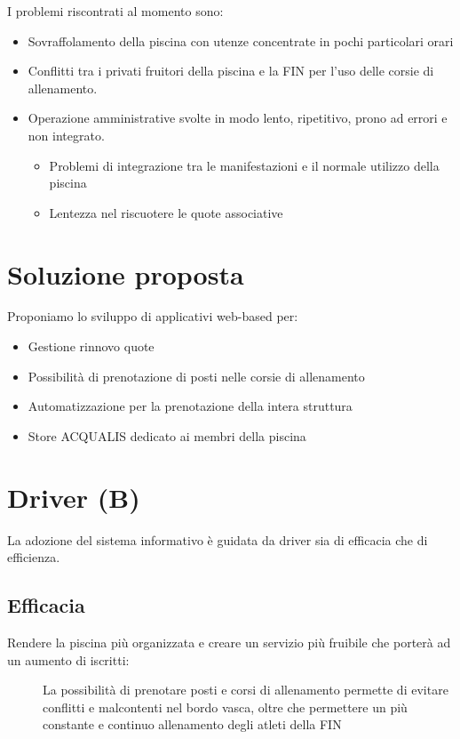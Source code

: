 \documentclass[11pt]{article} %
\begin{document}
I problemi riscontrati al momento sono:

\begin{itemize}
	\item Sovraffolamento della piscina con utenze concentrate in pochi particolari orari
	\item Conflitti tra i privati fruitori della piscina e la FIN per l'uso delle corsie di allenamento.
	\item Operazione amministrative svolte in modo lento, ripetitivo, prono ad errori e non integrato.
	\begin{itemize}
		\item Problemi di integrazione tra le manifestazioni e il normale utilizzo della piscina
		\item Lentezza nel riscuotere le quote associative
	\end{itemize}
\end{itemize}

\section{Soluzione proposta}

Proponiamo lo sviluppo di applicativi web-based per:

\begin{itemize}
	\item Gestione rinnovo quote
	\item Possibilità di prenotazione di posti nelle corsie di allenamento
	\item Automatizzazione per la prenotazione della intera struttura
	\item Store ACQUALIS dedicato ai membri della piscina
\end{itemize}

\section{Driver (B)}

La adozione del sistema informativo è guidata da driver sia di efficacia che di efficienza.

\subsection{Efficacia}

\begin{description}
	\item[Rendere la piscina più organizzata e creare un servizio più fruibile che porterà ad un aumento di iscritti: ]La possibilità di prenotare posti e corsi di allenamento permette di evitare conflitti e malcontenti nel bordo vasca, oltre che permettere un più constante e continuo allenamento degli atleti della FIN
\end{description}
\end{document}
